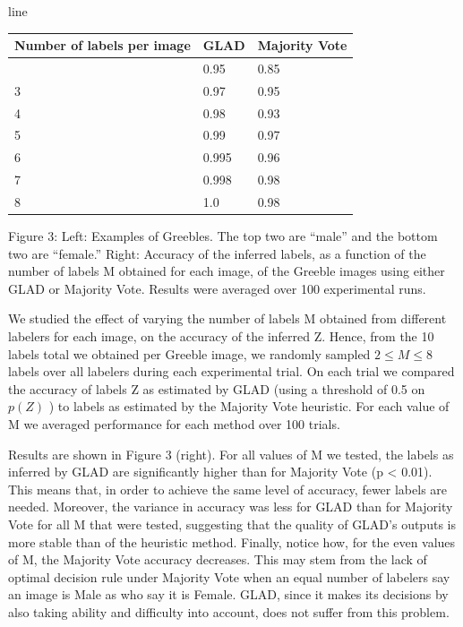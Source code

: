 \documentclass[
]{article}
\newcounter{none} %
\begin{document}
line

{\def\LTcaptype{none} %
\begin{longtable}[]{@{}lll@{}}
\toprule\noalign{}
Number of labels per image & GLAD & Majority Vote \\
\midrule\noalign{}
\endhead
\bottomrule\noalign{}
\endlastfoot
2 & 0.95 & 0.85 \\
3 & 0.97 & 0.95 \\
4 & 0.98 & 0.93 \\
5 & 0.99 & 0.97 \\
6 & 0.995 & 0.96 \\
7 & 0.998 & 0.98 \\
8 & 1.0 & 0.98 \\
\end{longtable}
}

Figure 3: Left: Examples of Greebles. The top two are ``male'' and the
bottom two are ``female.'' Right: Accuracy of the inferred labels, as a
function of the number of labels M obtained for each image, of the
Greeble images using either GLAD or Majority Vote. Results were averaged
over 100 experimental runs.

We studied the effect of varying the number of labels M obtained from
different labelers for each image, on the accuracy of the inferred Z.
Hence, from the 10 labels total we obtained per Greeble image, we
randomly sampled \(2 \leq M \leq 8\) labels over all labelers during
each experimental trial. On each trial we compared the accuracy of
labels Z as estimated by GLAD (using a threshold of 0.5 on \(p(Z)\) ) to
labels as estimated by the Majority Vote heuristic. For each value of M
we averaged performance for each method over 100 trials.

Results are shown in Figure 3 (right). For all values of M we tested,
the labels as inferred by GLAD are significantly higher than for
Majority Vote (p \textless{} 0.01). This means that, in order to achieve
the same level of accuracy, fewer labels are needed. Moreover, the
variance in accuracy was less for GLAD than for Majority Vote for all M
that were tested, suggesting that the quality of GLAD's outputs is more
stable than of the heuristic method. Finally, notice how, for the even
values of M, the Majority Vote accuracy decreases. This may stem from
the lack of optimal decision rule under Majority Vote when an equal
number of labelers say an image is Male as who say it is Female. GLAD,
since it makes its decisions by also taking ability and difficulty into
account, does not suffer from this problem.
\end{document}
